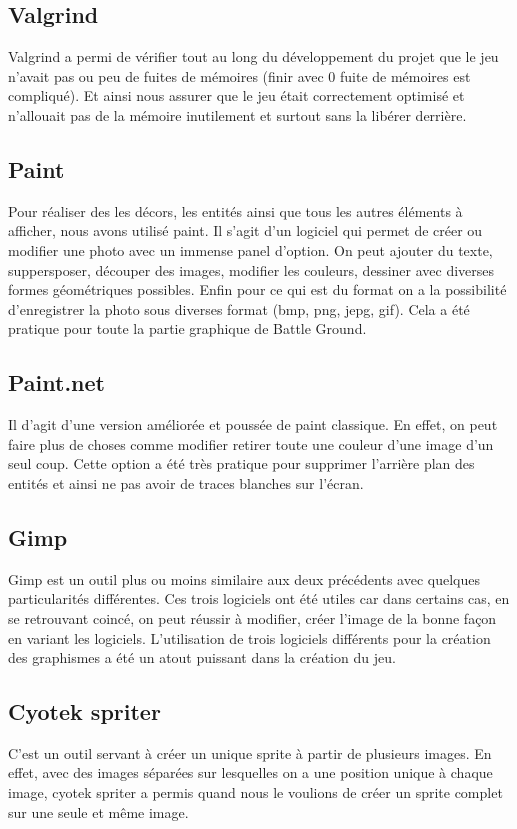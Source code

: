\documentclass[a4paper,11pt]{article}
\begin{document}
\subsection{Valgrind}
Valgrind a permi de vérifier tout au long du développement du projet que le jeu n'avait pas ou peu de fuites de mémoires (finir avec 0 fuite de mémoires est compliqué). Et ainsi nous
assurer que le jeu était correctement optimisé et n'allouait pas de la mémoire inutilement et surtout sans la libérer derrière.\\
\subsection{Paint}
Pour réaliser des les décors, les entités ainsi que tous les autres éléments à afficher,
nous avons utilisé paint. Il s'agit d'un logiciel qui permet de créer ou modifier une photo avec un immense panel d'option. On peut ajouter du texte,
suppersposer, découper des images, modifier les couleurs, dessiner avec diverses formes géométriques possibles. Enfin pour ce qui est du format on a la possibilité d'enregistrer la photo sous diverses format (bmp, png, jepg, gif). Cela a été pratique
pour toute la partie graphique de Battle Ground.\\
\subsection{Paint.net}
Il d'agit d'une version améliorée et poussée de paint classique. En effet, on peut faire plus de choses comme modifier retirer toute une couleur
d'une image d'un seul coup. Cette option a été très pratique pour supprimer l'arrière plan des entités et ainsi ne pas avoir de traces blanches sur l'écran.\\
\subsection{Gimp}
Gimp est un outil plus ou moins similaire aux deux précédents avec quelques particularités différentes. Ces trois logiciels ont été utiles car dans certains cas, en se retrouvant coincé,
on peut réussir à modifier, créer l'image de la bonne façon en variant les logiciels. L'utilisation de trois logiciels différents pour la création des graphismes a été un atout puissant dans la création du jeu.\\
\subsection{Cyotek spriter}
C'est un outil servant à créer un unique sprite à partir de plusieurs images. En effet, avec des images séparées sur lesquelles on a une position
unique à chaque image, cyotek spriter a permis quand nous le voulions de créer un sprite complet sur une seule et même image.\\ 
\end{document}
